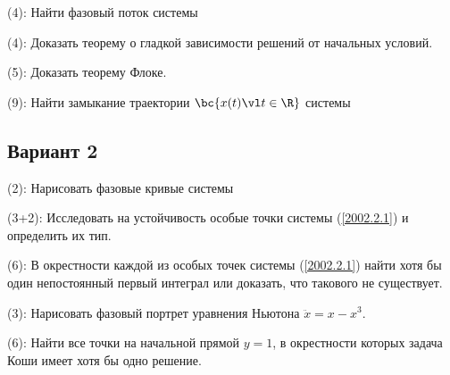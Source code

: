 \documentclass[a4paper]{article}
\newcommand{\skill}[1]{\textsf{(#1):}}
\begin{document}
\begin{problem}
\skill{4} Найти фазовый поток системы
\end{problem}

\begin{problem}
\skill{4}
Доказать теорему о гладкой зависимости решений от начальных условий.
\end{problem}

\begin{problem}
\skill{5}
Доказать теорему Флоке.
\end{problem}

\begin{problem}
\skill{9} Найти замыкание траектории $\bc{x(t)\vl t \in \R}$ системы
\end{problem}

\subsection{Вариант 2}

\begin{problem}
\skill{2} Нарисовать фазовые кривые системы
\end{problem}

\begin{problem}
\skill{3+2}
Исследовать на устойчивость особые точки системы (\ref{2002.2.1}) и определить их тип.
\end{problem}

\begin{problem}
\skill{6} В окрестности каждой из особых точек системы (\ref{2002.2.1}) найти хотя бы
один непостоянный первый интеграл или доказать, что такового не существует.
\end{problem}

\begin{problem}
\skill{3}
Нарисовать фазовый портрет уравнения Ньютона $\ddot x = x - x^3$.
\end{problem}

\begin{problem}
\skill{6}
Найти все точки на начальной прямой $y = 1$, в окрестности которых задача Коши
имеет хотя бы одно решение.
\end{problem}
\end{document}
